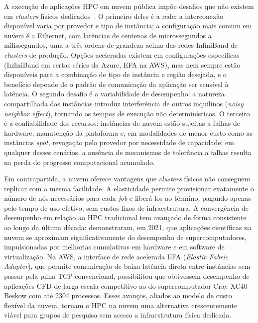 A execução de aplicações HPC em nuvem pública impõe desafios que não existem em
\textit{clusters} físicos dedicados~\cite{netto2018hpccloud}. O primeiro deles é a
rede: a interconexão disponível varia por provedor e tipo de instância; a
configuração mais comum em nuvem é a Ethernet, com latências de centenas de
microssegundos a milissegundos, uma a três ordens de grandeza acima das redes
InfiniBand de \textit{clusters} de produção. Opções aceleradas existem em
configurações específicas (InfiniBand em certas séries da Azure, EFA na AWS), mas
nem sempre estão disponíveis para a combinação de tipo de instância e região
desejada, e o benefício depende de o padrão de comunicação da aplicação ser sensível
à latência. O segundo desafio é a variabilidade de desempenho: a natureza
compartilhada das instâncias introduz interferência de outros inquilinos
(\textit{noisy neighbor effect}), tornando os tempos de execução não determinísticos.
O terceiro é a confiabilidade dos recursos: instâncias de nuvem estão sujeitas a
falhas de hardware, manutenção da plataforma e, em modalidades de menor custo como
as instâncias \textit{spot}, revogação pelo provedor por necessidade de capacidade;
em qualquer desses cenários, a ausência de mecanismos de tolerância a falhas resulta
na perda do progresso computacional acumulado.

Em contrapartida, a nuvem oferece vantagens que \textit{clusters} físicos não
conseguem replicar com a mesma facilidade. A elasticidade permite provisionar
exatamente o número de nós necessários para cada \textit{job} e liberá-los ao
término, pagando apenas pelo tempo de uso efetivo, sem custos fixos de infraestrutura.
A convergência de desempenho em relação ao HPC tradicional tem avançado de forma
consistente ao longo da última década:  demonstraram, em
2021, que aplicações científicas na nuvem se aproximam significativamente do
desempenho de supercomputadores, impulsionadas por melhorias cumulativas em hardware
e em software de virtualização. Na AWS, a interface de rede acelerada EFA
(\textit{Elastic Fabric Adapter}), que permite comunicação de baixa latência direta
entre instâncias sem passar pela pilha TCP convencional, possibilitou que
 obtivessem desempenho de aplicações CFD de larga
escala competitivo ao do supercomputador Cray XC40 Beskow com até 2304 processos.
Esses avanços, aliados ao modelo de custo flexível da nuvem, tornam o HPC na nuvem
uma alternativa crescentemente viável para grupos de
pesquisa sem acesso a infraestrutura física dedicada.


